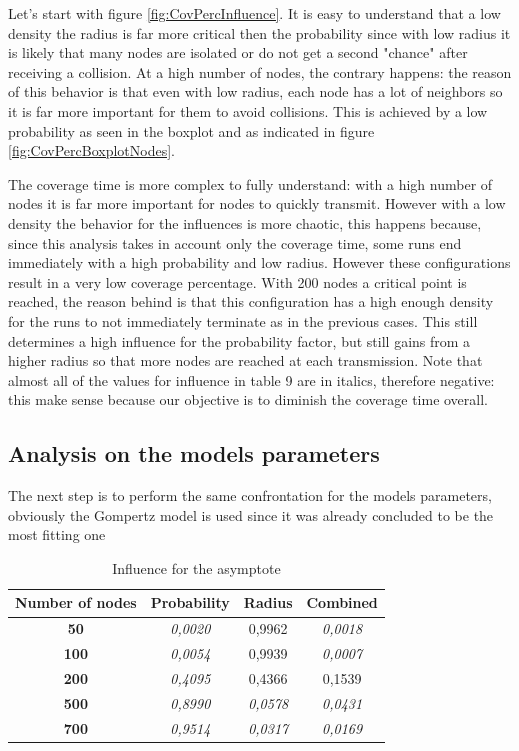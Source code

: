 Let's start with figure \ref{fig:CovPercInfluence}. It is easy to understand that a low density the radius is far more critical then the probability since with low radius it is likely that many nodes are isolated or do not get a second "chance" after receiving a collision. At a high number of nodes, the contrary happens: the reason of this behavior is that even with low radius, each node has a lot of neighbors so it is far more important for them to avoid collisions. This is achieved by a low probability as seen in the boxplot and as indicated in figure  \ref{fig:CovPercBoxplotNodes}.

The coverage time is more complex to fully understand: with a high number of nodes it is far more important for nodes to quickly transmit. However with a low density the behavior for the influences is more chaotic, this happens because, since this analysis takes in account only the coverage time, some runs end immediately with a high probability and low radius. However these configurations result in a very low coverage percentage. With 200 nodes a critical point is reached, the reason behind is that this configuration has a high enough density for the runs to not immediately terminate as in the previous cases. This still determines a high influence for the probability factor, but still gains from a higher radius so that more nodes are reached at each transmission. Note that almost all of the values for influence in table 9 are in italics, therefore negative: this make sense because our objective is to diminish the coverage time overall.

\iffalse
\subsection{Analysis on the models parameters}
The next step is to perform the same confrontation for the models parameters, obviously the Gompertz model is used since it was already concluded to be the most fitting one

\begin{table}[H]
\centering
\begin{tabular}{|c|c|c|c|}
\hline
\textbf{Number of   nodes} & \textbf{Probability} & \textbf{Radius} & \textbf{Combined} \\ \hline
\textbf{50} & \textit{0,0020} & 0,9962 & \textit{0,0018} \\ \hline
\textbf{100} & \textit{0,0054} & 0,9939 & \textit{0,0007} \\ \hline
\textbf{200} & \textit{0,4095} & 0,4366 & 0,1539 \\ \hline
\textbf{500} & \textit{0,8990} & \textit{0,0578} & \textit{0,0431} \\ \hline
\textbf{700} & \textit{0,9514} & \textit{0,0317} & \textit{0,0169} \\ \hline
\end{tabular}
\caption{Influence for the asymptote}
\end{table}

